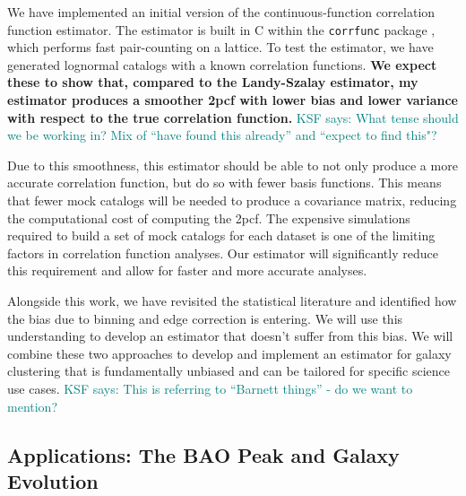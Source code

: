 \documentclass[12pt, fullpage, letterpaper]{article}
\newcommand{\KSF}[1]{\textcolor{teal}{KSF says: #1}}
\newcommand{\cf}{2pcf\xspace}
\begin{document}
We have implemented an initial version of the continuous-function correlation function estimator.
The estimator is built in C within the \texttt{corrfunc} package \citep{Sinha2017}, which performs fast pair-counting on a lattice.
To test the estimator, we have generated lognormal catalogs with a known correlation functions. 
\textbf{We expect these to show that, compared to the Landy-Szalay estimator, my estimator produces a smoother \cf with lower bias and lower variance with respect to the true correlation function.} \KSF{What tense should we be working in? Mix of ``have found this already'' and ``expect to find this"?}

Due to this smoothness, this estimator should be able to not only produce a more accurate correlation function, but do so with fewer basis functions.
This means that fewer mock catalogs will be needed to produce a covariance matrix, reducing the computational cost of computing the \cf.
The expensive simulations required to build a set of mock catalogs for each dataset is one of the limiting factors in correlation function analyses.
Our estimator will significantly reduce this requirement and allow for faster and more accurate analyses.

Alongside this work, we have revisited the statistical literature and identified how the bias due to binning and edge correction is entering. 
We will use this understanding to develop an estimator that doesn't suffer from this bias.
We will combine these two approaches to develop and implement an estimator for galaxy clustering that is fundamentally unbiased and can be tailored for specific science use cases.
\KSF{This is referring to ``Barnett things'' - do we want to mention?}

\subsection{Applications: The BAO Peak and Galaxy Evolution}
\end{document}
